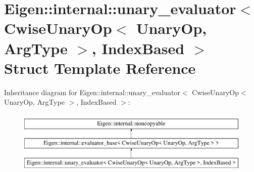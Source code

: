 \hypertarget{struct_eigen_1_1internal_1_1unary__evaluator_3_01_cwise_unary_op_3_01_unary_op_00_01_arg_type_01_4_00_01_index_based_01_4}{}\section{Eigen\+::internal\+::unary\+\_\+evaluator$<$ Cwise\+Unary\+Op$<$ Unary\+Op, Arg\+Type $>$, Index\+Based $>$ Struct Template Reference}
\label{struct_eigen_1_1internal_1_1unary__evaluator_3_01_cwise_unary_op_3_01_unary_op_00_01_arg_type_01_4_00_01_index_based_01_4}
Inheritance diagram for Eigen\+::internal\+::unary\+\_\+evaluator$<$ Cwise\+Unary\+Op$<$ Unary\+Op, Arg\+Type $>$, Index\+Based $>$\+:\begin{figure}[H]
\begin{center}
\leavevmode
\includegraphics[height=3.000000cm]{struct_eigen_1_1internal_1_1unary__evaluator_3_01_cwise_unary_op_3_01_unary_op_00_01_arg_type_01_4_00_01_index_based_01_4}
\end{center}
\end{figure}
